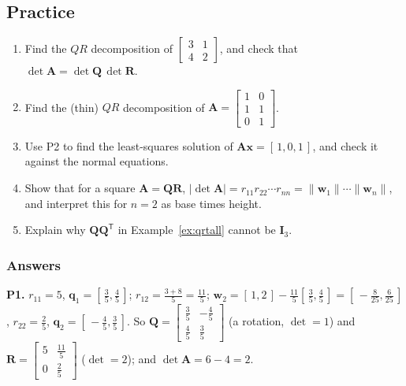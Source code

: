\documentclass[11pt]{article}
\theoremstyle{plain}
\theoremstyle{definition}
\theoremstyle{remark}
\newcommand{\vc}[1]{\mathbf{#1}}
\newcommand{\mt}[1]{\mathbf{#1}}
\newcommand{\norm}[1]{\lVert #1\rVert}
\newcommand{\T}{^{\mathsf{T}}}
\begin{document}
\subsection{Practice}
\begin{enumerate}[label=\textbf{P\arabic*.},leftmargin=2.6em,itemsep=5pt]
  \item Find the $QR$ decomposition of $\begin{bmatrix}3&1\\4&2\end{bmatrix}$, and
        check that $\det\mt{A}=\det\mt{Q}\,\det\mt{R}$.
  \item Find the (thin) $QR$ decomposition of
        $\mt{A}=\begin{bmatrix}1&0\\1&1\\0&1\end{bmatrix}$.
  \item Use P2 to find the least-squares solution of $\mt{A}\vc{x}=[\,1,0,1\,]$, and
        check it against the normal equations.
  \item Show that for a square $\mt{A}=\mt{Q}\mt{R}$,
        $|\det\mt{A}|=r_{11}r_{22}\cdots r_{nn}=\norm{\vc{w}_1}\cdots\norm{\vc{w}_n}$,
        and interpret this for $n=2$ as base times height.
  \item Explain why $\mt{Q}\mt{Q}\T$ in Example~\ref{ex:qrtall} cannot be
        $\mt{I}_3$.
\end{enumerate}

\subsubsection*{Answers}

\noindent\textbf{P1.} $r_{11}=5$, $\vc{q}_1=[\,\frac35,\frac45\,]$;
$r_{12}=\frac{3+8}{5}=\frac{11}{5}$;
$\vc{w}_2=[\,1,2\,]-\frac{11}{5}[\,\frac35,\frac45\,]=[\,-\frac{8}{25},\frac{6}{25}\,]$,
$r_{22}=\frac25$, $\vc{q}_2=[\,-\frac45,\frac35\,]$. So
$\mt{Q}=\begin{bmatrix}\frac35&-\frac45\\[2pt]\frac45&\frac35\end{bmatrix}$ (a rotation,
$\det=1$) and $\mt{R}=\begin{bmatrix}5&\frac{11}{5}\\[2pt]0&\frac25\end{bmatrix}$
($\det=2$); and $\det\mt{A}=6-4=2$. \checkmark
\end{document}
